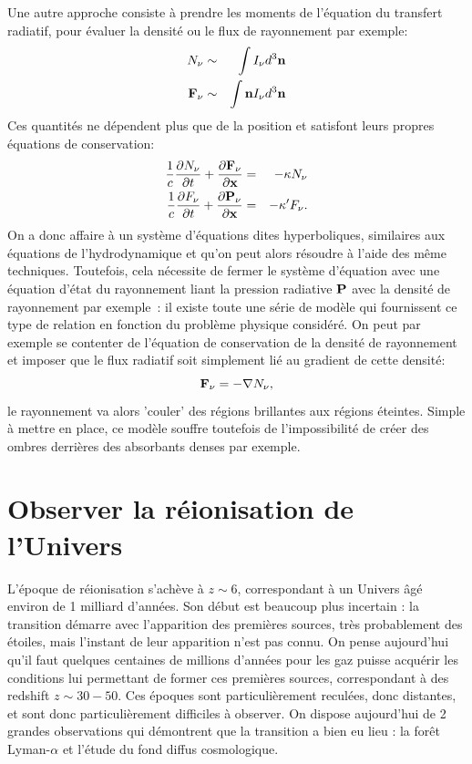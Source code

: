 Une autre approche consiste à prendre les moments de l'équation du transfert radiatif, pour évaluer la densité ou le flux de rayonnement par exemple:
\begin{eqnarray}
N_\nu&\sim&\int I_\nu d^3{\bf n}\\
{\bf F}_\nu&\sim&\int {\bf n} I_\nu d^3{\bf n}
\end{eqnarray}
Ces quantités ne dépendent plus que de la position et satisfont leurs propres équations de conservation:
\begin{eqnarray}
\frac{1}{c}\frac{\partial N_\nu}{\partial t}+\frac{\partial {\bf F_\nu}}{\partial {\bf x}}&=&-\kappa N_\nu\\
\frac{1}{c}\frac{\partial F_\nu}{\partial t}+\frac{\partial {\bf P_\nu}}{\partial {\bf x}}&=&-\kappa' F_\nu.
\end{eqnarray}
On a donc affaire à un système d'équations dites hyperboliques, similaires aux équations de l'hydrodynamique et qu'on peut alors résoudre à l'aide des même techniques. Toutefois, cela nécessite de fermer le système d'équation avec une équation d'état du rayonnement liant la pression radiative $\bf P$ avec la densité de rayonnement par exemple~: il existe toute une série de modèle qui fournissent ce type de relation en fonction du problème physique considéré. On peut par exemple se contenter de l'équation de conservation de la densité de rayonnement et imposer que le flux radiatif soit simplement lié au gradient de cette densité:
\begin{equation}
{\bf F_\nu}=-\nabla N_\nu,
\end{equation}
le rayonnement va alors 'couler' des régions brillantes aux régions éteintes. Simple à mettre en place, ce modèle souffre toutefois de l'impossibilité de créer des ombres derrières des absorbants denses par exemple.

\section{Observer la réionisation de l'Univers}
L'époque de réionisation s'achève à $z\sim 6$, correspondant à un Univers âgé environ de 1 milliard d'années. Son début est beaucoup plus incertain : la transition démarre avec l'apparition des premières sources, très probablement des étoiles, mais l'instant de leur apparition n'est pas connu. On pense aujourd'hui qu'il faut quelques centaines de millions d'années pour les gaz puisse acquérir les conditions lui permettant de former ces premières sources, correspondant à des redshift $z\sim 30- 50$. Ces époques sont particulièrement reculées, donc distantes, et sont donc particulièrement difficiles à observer.  On dispose aujourd'hui de 2 grandes observations qui démontrent que la transition a bien eu lieu : la forêt Lyman-$\alpha$ et l'étude du fond diffus cosmologique.

